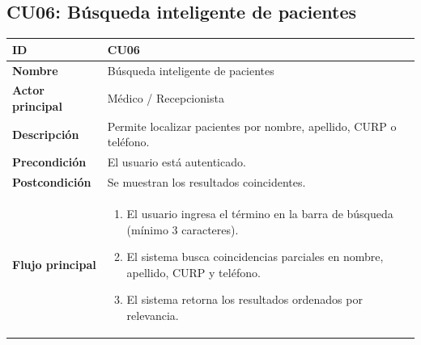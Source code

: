 \documentclass[11pt,a4paper]{article}
\begin{document}
\subsection*{CU06: Búsqueda inteligente de pacientes}
\begin{longtable}{|L{3.5cm}|L{10cm}|}
    \hline
    \textbf{ID}              & CU06                                                               \\ \hline
    \textbf{Nombre}          & Búsqueda inteligente de pacientes                                  \\ \hline
    \textbf{Actor principal} & Médico / Recepcionista                                             \\ \hline
    \textbf{Descripción}     & Permite localizar pacientes por nombre, apellido, CURP o teléfono. \\ \hline
    \textbf{Precondición}    & El usuario está autenticado.                                       \\ \hline
    \textbf{Postcondición}   & Se muestran los resultados coincidentes.                           \\ \hline
    \textbf{Flujo principal} &
    \begin{enumerate}
        \item El usuario ingresa el término en la barra de búsqueda (mínimo 3 caracteres).
        \item El sistema busca coincidencias parciales en nombre, apellido, CURP y teléfono.
        \item El sistema retorna los resultados ordenados por relevancia.
    \end{enumerate}       \\ \hline
\end{longtable}

\end{document}
